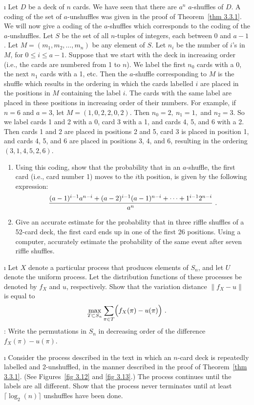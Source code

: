 \begin{LJSItem}
\i\label{exer 3.3.3}  Let $D$ be a deck of $n$ cards.  We have seen that there are
$a^n$
$a$-shuffles of
$D$.   A coding of the set of $a$-unshuffles was given in the proof of
Theorem~\ref{thm 3.3.1}. We will now give a coding of the $a$-shuffles which
corresponds to the coding of the
$a$-unshuffles.  Let $S$ be the set of all $n$-tuples of integers, each between 0 and
$a-1$.  Let $M = (m_1, m_2, \ldots, m_n)$ be any element of
$S$.   Let $n_i$ be the number of $i$'s in $M$, for $0 \le i \le a-1$.  Suppose that
we start with the deck in increasing order (i.e., the cards are numbered from 1 to
$n$).  We label the first $n_0$ cards with a 0, the next $n_1$ cards with a 1, etc. 
Then the $a$-shuffle corresponding to $M$ is the shuffle which results in the ordering
in which the cards labelled
$i$ are placed in the positions in $M$ containing the label $i$.  The cards with the
same label are placed in these positions in increasing order of their numbers.  For
example, if $n = 6$ and
$a = 3$, let $M = (1, 0, 2, 2, 0, 2)$.  Then $n_0 = 2,\ n_1 = 1,$ and $n_2 = 3$.  So
we label cards 1 and 2 with a 0, card 3 with a 1, and cards 4, 5, and 6 with a 2. 
Then cards 1 and 2 are placed in positions 2 and 5, card 3 is placed in position 1,
and cards 4, 5, and 6 are placed in positions 3, 4, and 6, resulting in the ordering
$(3, 1, 4, 5, 2, 6)$.
\begin{enumerate}
\item Using this coding, show that the probability that in an $a$-shuffle, the first
card (i.e., card number 1) moves to the $i$th position, is given by the following 
expression:
$$ {{(a-1)^{i-1}a^{n-i} + (a-2)^{i-1}(a-1)^{n-i} + \cdots + 1^{i-1}2^{n-i}}\over{a^n}}\ .
$$
\item Give an accurate estimate for the probability that in three riffle shuffles of a
52-card deck, the first card ends up in one of the first 26 positions.  Using a
computer, accurately estimate the probability of the same event after seven riffle
shuffles.  
\end{enumerate}

\i\label{exer 3.3.4} Let $X$ denote a particular process that produces elements of
$S_n$, and let $U$ denote the uniform process.  Let the distribution functions of
these processes be denoted by $f_X$ and $u$, respectively.  Show that the variation
distance 
\newline	
$\parallel f_X - u\parallel$ is equal to 
$$\max_{T \subset S_n} \sum_{\pi \in T} \Bigl(f_X(\pi) - u(\pi)\Bigr)\ .$$ 
: 
Write the permutations in $S_n$ in decreasing order of the difference $f_X(\pi) -
u(\pi)$.  

\i\label{exer 3.3.5} Consider the process described in the text in which an
$n$-card deck is repeatedly labelled and 2-unshuffled, in the manner
described in the proof of Theorem~\ref{thm 3.3.1}.  (See
Figures~\ref{fig 3.12} and \ref{fig 3.13}.)  The process continues until the labels are all
different.  Show that the process never terminates until at least
$\lceil \log_2(n) \rceil$ unshuffles have been done.
\end{LJSItem}
